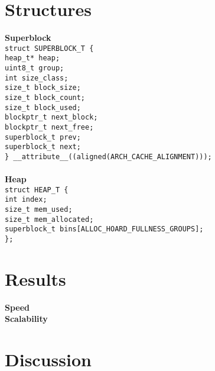 \documentclass[11pt]{article}
\begin{document}
\newpage

\section{Structures}

\textbf{Superblock}
\texttt{
\\
struct SUPERBLOCK\_T \{
\\
\indent   heap\_t* heap;
\\
\indent   uint8\_t group;
\\
\indent    int size\_class;
\\
\indent    size\_t block\_size;
\\
\indent    size\_t block\_count;
\\
\indent    size\_t block\_used;
\\
\indent    blockptr\_t next\_block;
\\
\indent    blockptr\_t next\_free;
\\
\indent    superblock\_t\* prev;
\\
\indent    superblock\_t\* next;
\\
\} \_\_attribute\_\_((aligned(ARCH\_CACHE\_ALIGNMENT)));
}
\\
\\

\noindent \textbf{Heap}
\\
\texttt{struct HEAP\_T \{
\\
\indent    int index;
\\
\indent    size\_t mem\_used;
\\
 \indent   size\_t mem\_allocated;
\\
 \indent   superblock\_t\* bins[ALLOC\_HOARD\_FULLNESS\_GROUPS];
\\
\};}

\newpage
\noindent
\section{Results}
\textbf{Speed}
\\
\textbf{Scalability}
\\
\section{Discussion}
 
\end{document}
